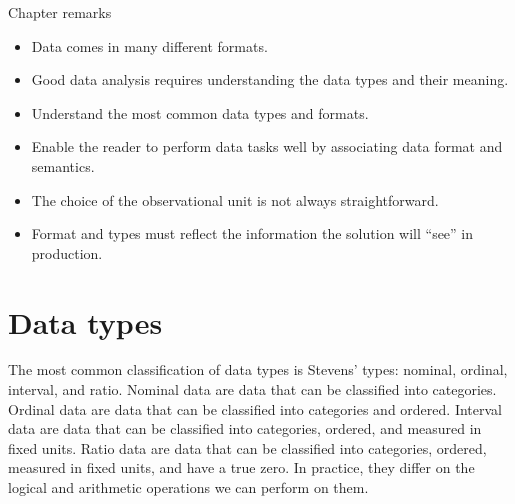 \begin{mainbox}{Chapter remarks}


  \startcontents[chapters]
  \vspace{1em}


  \begin{itemize}
    \itemsep0em
    \item Data comes in many different formats.
    \item Good data analysis requires understanding the data types and their meaning.
  \end{itemize}


  \begin{itemize}
    \itemsep0em
    \item Understand the most common data types and formats.
    \item Enable the reader to perform data tasks well by associating data format and semantics.
  \end{itemize}


  \begin{itemize}
    \itemsep0em
    \item The choice of the observational unit is not always straightforward.
    \item Format and types must reflect the information the solution will ``see'' in
      production.
  \end{itemize}
\end{mainbox}

{}
\clearpage

\section{Data types}

The most common classification of data types is Stevens' types: nominal, ordinal,
interval, and ratio.  Nominal data are data that can be classified into categories.
Ordinal data are data that can be classified into categories and ordered.  Interval data
are data that can be classified into categories, ordered, and measured in fixed units.
Ratio data are data that can be classified into categories, ordered, measured in fixed
units, and have a true zero.  In practice, they differ on the logical and arithmetic operations
we can perform on them.

